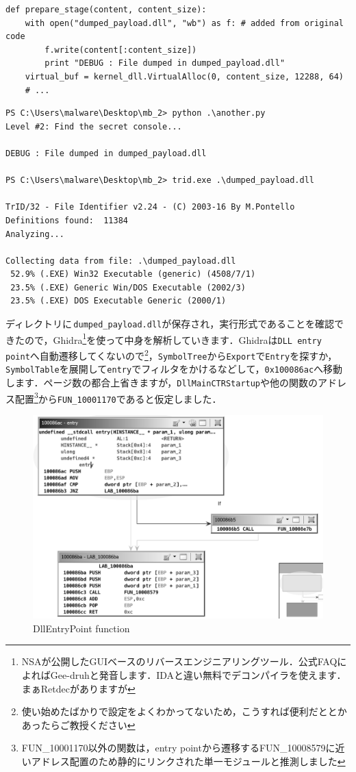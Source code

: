 \begin{tcolorbox}[title=ダンプファイルの取得, sharp corners, left=2mm]\scriptsize
\begin{verbatim}
def prepare_stage(content, content_size):
    with open("dumped_payload.dll", "wb") as f: # added from original code
        f.write(content[:content_size])
        print "DEBUG : File dumped in dumped_payload.dll"
    virtual_buf = kernel_dll.VirtualAlloc(0, content_size, 12288, 64)
    # ...
\end{verbatim}
\begin{verbatim}
PS C:\Users\malware\Desktop\mb_2> python .\another.py
Level #2: Find the secret console...

DEBUG : File dumped in dumped_payload.dll

PS C:\Users\malware\Desktop\mb_2> trid.exe .\dumped_payload.dll

TrID/32 - File Identifier v2.24 - (C) 2003-16 By M.Pontello
Definitions found:  11384
Analyzing...

Collecting data from file: .\dumped_payload.dll
 52.9% (.EXE) Win32 Executable (generic) (4508/7/1)
 23.5% (.EXE) Generic Win/DOS Executable (2002/3)
 23.5% (.EXE) DOS Executable Generic (2000/1)
\end{verbatim}
\end{tcolorbox}
ディレクトリに\faFileCodeO \,\texttt{dumped\_payload.dll}が保存され，実行形式であることを確認できたので，Ghidra\footnote{NSAが公開したGUIベースのリバースエンジニアリングツール．公式FAQによればGee-druhと発音します．IDAと違い無料でデコンパイラを使えます．まぁRetdecがありますが}を使って中身を解析していきます．Ghidraは\texttt{DLL entry point}へ自動遷移してくないので\footnote{使い始めたばかりで設定をよくわかってないため，こうすれば便利だととかあったらご教授ください}，\texttt{SymbolTree}から\texttt{Export}で\texttt{Entry}を探すか，\texttt{SymbolTable}を展開して\texttt{entry}でフィルタをかけるなどして，\texttt{0x100086ac}へ移動します．ページ数の都合上省きますが，\texttt{DllMainCTRStartup}や他の関数のアドレス配置\footnote{FUN\_10001170以外の関数は，entry pointから遷移するFUN\_10008579に近いアドレス配置のため静的にリンクされた単一モジュールと推測しました}から\texttt{FUN\_10001170}であると仮定しました．
\begin{figure}[H]
    \centering
    \includegraphics[width=0.7\linewidth]{./assets/takuzoo3868asset/ghidra_001_gray.png}
    \caption{DllEntryPoint function}
    \label{fig:ghdra_001}
\end{figure}
